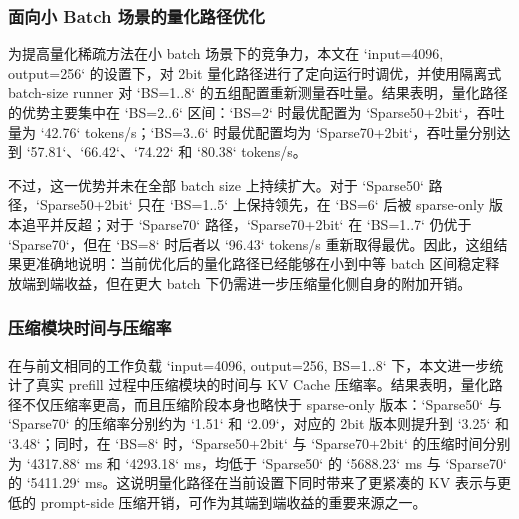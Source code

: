 \subsubsection{面向小 Batch 场景的量化路径优化}

为提高量化稀疏方法在小 batch 场景下的竞争力，本文在 `input=4096, output=256` 的设置下，对 2bit 量化路径进行了定向运行时调优，并使用隔离式 batch-size runner 对 `BS=1..8` 的五组配置重新测量吞吐量。结果表明，量化路径的优势主要集中在 `BS=2..6` 区间：`BS=2` 时最优配置为 `Sparse50+2bit`，吞吐量为 `42.76` tokens/s；`BS=3..6` 时最优配置均为 `Sparse70+2bit`，吞吐量分别达到 `57.81`、`66.42`、`74.22` 和 `80.38` tokens/s。

不过，这一优势并未在全部 batch size 上持续扩大。对于 `Sparse50` 路径，`Sparse50+2bit` 只在 `BS=1..5` 上保持领先，在 `BS=6` 后被 sparse-only 版本追平并反超；对于 `Sparse70` 路径，`Sparse70+2bit` 在 `BS=1..7` 仍优于 `Sparse70`，但在 `BS=8` 时后者以 `96.43` tokens/s 重新取得最优。因此，这组结果更准确地说明：当前优化后的量化路径已经能够在小到中等 batch 区间稳定释放端到端收益，但在更大 batch 下仍需进一步压缩量化侧自身的附加开销。

\subsubsection{压缩模块时间与压缩率}

在与前文相同的工作负载 `input=4096, output=256, BS=1..8` 下，本文进一步统计了真实 prefill 过程中压缩模块的时间与 KV Cache 压缩率。结果表明，量化路径不仅压缩率更高，而且压缩阶段本身也略快于 sparse-only 版本：`Sparse50` 与 `Sparse70` 的压缩率分别约为 `1.51\times` 和 `2.09\times`，对应的 2bit 版本则提升到 `3.25\times` 和 `3.48\times`；同时，在 `BS=8` 时，`Sparse50+2bit` 与 `Sparse70+2bit` 的压缩时间分别为 `4317.88` ms 和 `4293.18` ms，均低于 `Sparse50` 的 `5688.23` ms 与 `Sparse70` 的 `5411.29` ms。这说明量化路径在当前设置下同时带来了更紧凑的 KV 表示与更低的 prompt-side 压缩开销，可作为其端到端收益的重要来源之一。
